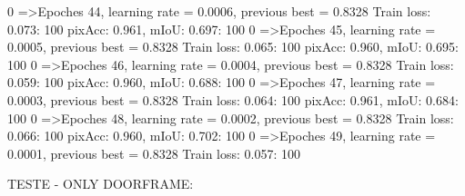   0%
=>Epoches 44, learning rate = 0.0006,                 previous best = 0.8328
Train loss: 0.073: 100%
pixAcc: 0.961, mIoU: 0.697: 100%
  0%
=>Epoches 45, learning rate = 0.0005,                 previous best = 0.8328
Train loss: 0.065: 100%
pixAcc: 0.960, mIoU: 0.695: 100%
  0%
=>Epoches 46, learning rate = 0.0004,                 previous best = 0.8328
Train loss: 0.059: 100%
pixAcc: 0.960, mIoU: 0.688: 100%
  0%
=>Epoches 47, learning rate = 0.0003,                 previous best = 0.8328
Train loss: 0.064: 100%
pixAcc: 0.961, mIoU: 0.684: 100%
  0%
=>Epoches 48, learning rate = 0.0002,                 previous best = 0.8328
Train loss: 0.066: 100%
pixAcc: 0.960, mIoU: 0.702: 100%
  0%
=>Epoches 49, learning rate = 0.0001,                 previous best = 0.8328
Train loss: 0.057: 100%


\bigskip


TESTE - ONLY DOORFRAME:

